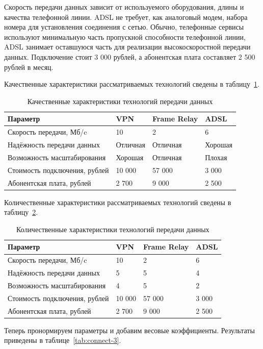 \documentclass[russian,utf8,emptystyle]{eskdtext}
\begin{document}
Скорость передачи данных зависит от используемого оборудования, длины и качества телефонной линии. ADSL не требует, как аналоговый модем, набора номера для установления соединения с сетью. Обычно, телефонные сервисы используют минимальную часть пропускной способности телефонной линии, ADSL занимает оставшуюся часть для реализации высокоскоростной передачи данных. Подключение стоит 3 000 рублей, а абонентская плата составляет 2 500 рублей в месяц.

Качественные характеристики рассматриваемых технологий сведены в таблицу~\ref{tab:connect-1}.

\begin{longtable}{p{7cm}|p{2cm}|p{2cm}|p{2cm}}
\caption{Качественные характеристики технологий передачи данных}
\label{tab:connect-1} \\
Параметр  & VPN & Frame Relay & ADSL \\ 
\hline 
Скорость передачи, Мб/c     & 10 & 2 & 6  \\ 
Надёжность передачи данных & Отличная & Отличная & Хорошая  \\ 
Возможность масштабирования & Хорошая & Отличная & Плохая  \\ 
Стоимость подключения, рублей & 10 000 & 57 000 & 3 000  \\ 
Абонентская плата, рублей & 2 700 & 9 000 & 2 500 \\
\end{longtable}

Количественные характеристики рассматриваемых технологий сведены в таблицу~\ref{tab:connect-2}.

\begin{longtable}{p{7cm}|p{2cm}|p{2cm}|p{2cm}}
\caption{Количественные характеристики технологий передачи данных}
\label{tab:connect-2} \\
Параметр  & VPN & Frame Relay & ADSL \\ 
\hline 
Скорость передачи, Мб/c     & 10 & 2 & 6  \\ 
Надёжность передачи данных & 5 & 5 & 4  \\ 
Возможность масштабирования & 4 & 5 & 2  \\ 
Стоимость подключения, рублей & 10 000 & 57 000 & 3 000  \\ 
Абонентская плата, рублей & 2 700 & 9 000 & 2 500 \\
\end{longtable}

Теперь пронормируем параметры и добавим весовые коэффициенты. Результаты приведены в таблице~\ref{tab:connect-3}.
\end{document}
